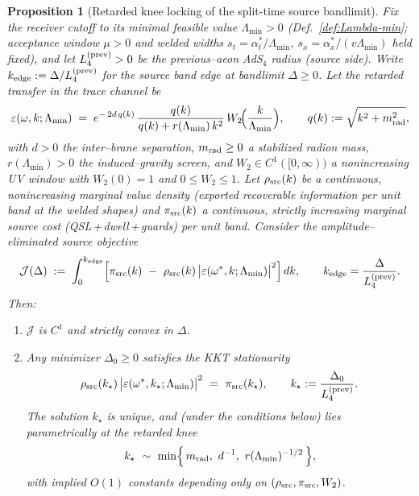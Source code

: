 \documentclass[10pt]{article}
\theoremstyle{definition}
\theoremstyle{plain}
\newtheorem{proposition}{Proposition}[section]
\begin{document}
\begin{proposition}[Retarded knee locking of the split-time source bandlimit]\label{prop:knee-lock}
Fix the receiver cutoff to its minimal feasible value $\Lambda_{\min}>0$ (Def.~\ref{def:Lambda-min}; acceptance window $\mu>0$ and welded
widths $s_t=\alpha_t^{*}/\Lambda_{\min}$, $s_x=\alpha_x^{*}/(v\Lambda_{\min})$ held fixed), and let $L_4^{\rm(prev)}>0$
be the previous–aeon AdS$_4$ radius (source side). Write $k_{\rm edge}:=\Delta/L_4^{\rm(prev)}$ for the \emph{source}
band edge at bandlimit $\Delta\ge 0$. Let the \emph{retarded transfer} in the trace channel be
\begin{equation}\label{eq:eps-knee}
\varepsilon(\omega,k;\Lambda_{\min})
\;=\;e^{-\,2d\,q(k)}\,\frac{q(k)}{q(k)+r(\Lambda_{\min})\,k^2}\,W_2\!\Big(\frac{k}{\Lambda_{\min}}\Big),\qquad
q(k):=\sqrt{k^2+m_{\rm rad}^2},
\end{equation}
with $d>0$ the inter–brane separation, $m_{\rm rad}\ge 0$ a stabilized radion mass, $r(\Lambda_{\min})>0$ the induced–gravity
screen, and $W_2\in C^1([0,\infty))$ a nonincreasing UV window with $W_2(0)=1$ and $0\le W_2\le 1$. Let
$\rho_{\rm src}(k)$ be a continuous, nonincreasing \emph{marginal value density} (exported recoverable information per unit band
at the welded shapes) and $\pi_{\rm src}(k)$ a continuous, strictly increasing \emph{marginal source cost} (QSL\,+\,dwell\,+\,guards)
per unit band. Consider the amplitude–eliminated source objective
\begin{equation}\label{eq:J-Delta}
\mathcal J(\Delta)\;:=\;\int_{0}^{k_{\rm edge}}\!\Big[\pi_{\rm src}(k)\ -\ \rho_{\rm src}(k)\,\big|\varepsilon(\omega^{*},k;\Lambda_{\min})\big|^2\Big]\,dk,\qquad 
k_{\rm edge}=\frac{\Delta}{L_4^{\rm(prev)}}.
\end{equation}
Then:
\begin{enumerate}
\item[(i)] $\mathcal J$ is $C^1$ and strictly \emph{convex} in $\Delta$.
\item[(ii)] Any minimizer $\Delta_0\ge 0$ satisfies the KKT stationarity
\begin{equation}\label{eq:KKT-stationarity}
\rho_{\rm src}(k_\star)\,\big|\varepsilon(\omega^{*},k_\star;\Lambda_{\min})\big|^2\ =\ \pi_{\rm src}(k_\star),\qquad k_\star:=\frac{\Delta_0}{L_4^{\rm(prev)}}.
\end{equation}
The solution $k_\star$ is unique, and (under the conditions below) lies parametrically at the \emph{retarded knee}
\begin{equation}\label{eq:kstar-min}
k_\star\ \sim\ \min\!\Big\{\,m_{\rm rad},\ d^{-1},\ r(\Lambda_{\min})^{-1/2}\,\Big\},
\end{equation}
with implied $O(1)$ constants depending only on $(\rho_{\rm src},\pi_{\rm src},W_2)$.
\end{enumerate}
\end{proposition}
\end{document}
